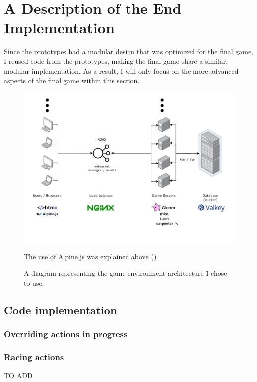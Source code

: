 \documentclass[]{final}
\begin{document}
\chapter{A Description of the End Implementation}
Since the prototypes had a modular design that was optimized for the final game,
I reused code from the prototypes, making the final game share a similar,
modular implementation. As a result, I will only focus on the more advanced
aspects of the final game within this section.

\begin{figure}[ht!]
  \centering
  \includegraphics[width=\linewidth]{final_architecture}
  \vspace*{-1.5cm}
  \caption{A diagram representing the game environment architecture I chose to use.}
  \label{fig: 3}
  The use of Alpine.js was explained above {\hypersetup{linkcolor=teal}(\pageref{alpine})}
\end{figure}

\section{Code implementation}

\subsection{Overriding actions in progress}

\subsection{Racing actions}
TO ADD
\end{document}
